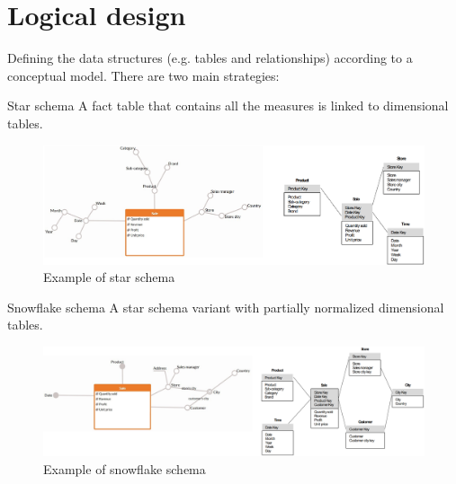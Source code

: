 \section{Logical design}
Defining the data structures (e.g. tables and relationships) according to a conceptual model.
There are two main strategies:
\begin{descriptionlist}
    \item[Star schema] 
        A fact table that contains all the measures is linked to dimensional tables.
        \begin{figure}[ht]
            \centering
            \includegraphics[width=\textwidth]{img/logical_star_schema.png}
            \caption{Example of star schema}
        \end{figure}

    \item[Snowflake schema] 
        A star schema variant with partially normalized dimensional tables.
        \begin{figure}[H]
            \centering
            \includegraphics[width=\textwidth]{img/logical_snowflake_schema.png}
            \caption{Example of snowflake schema}
        \end{figure}
\end{descriptionlist}